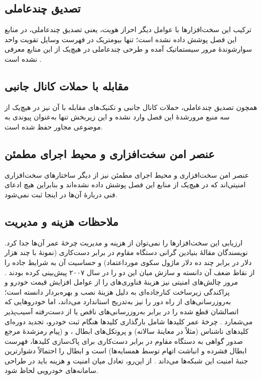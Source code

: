 \subsection{تصدیق چندعاملی}
ترکیب این سخت‌افزارها با عوامل دیگر احراز هویت، یعنی تصدیق چندعاملی، در منابع این فصل پوشش داده نشده است؛ تنها بیومتریک در فهرست وسایل تقویت واحد سوارشوندهٔ مرور سیستماتیک آمده و طرحی چندعاملی در هیچ‌یک از این منابع معرفی نشده است \cite{rahmawatiagustinaSystematicLiteratureReview2025}.

\subsection{مقابله با حملات کانال جانبی}
همچون تصدیق چندعاملی، حملات کانال جانبی و تکنیک‌های مقابله با آن نیز در هیچ‌یک از سه منبع مرورشدهٔ این فصل وارد نشده و این زیربخش تنها به‌عنوان پیوندی به موضوعی مجاور حفظ شده است.

\subsection{عنصر امن سخت‌افزاری و محیط اجرای مطمئن}
عنصر امن سخت‌افزاری و محیط اجرای مطمئن نیز از دیگر ساختارهای سخت‌افزاری امنیتی‌اند که در هیچ‌یک از منابع این فصل پوشش داده نشده‌اند و بنابراین هیچ ادعای فنی دربارهٔ آن‌ها در اینجا ثبت نمی‌شود.

\subsection{ملاحظات هزینه و مدیریت}
ارزیابی این سخت‌افزارها را نمی‌توان از هزینه و مدیریت چرخهٔ عمر آن‌ها جدا کرد. نویسندگان مقالهٔ بنیادین گرانی دستگاه مقاوم در برابر دست‌کاری (نمونهٔ  با چند هزار دلار در برابر چند ده دلار ماژول سکوی مورداعتماد) و حساسیت آن به شرایط جاده را از نقاط ضعف آن دانسته و سازش میان این دو را در سال ۲۰۰۷ پیش‌بینی کرده بودند \cite{SecuringVehicularAd}. مرور چالش‌های امنیتی نیز هزینهٔ فناوری‌های  را از عوامل افزایش قیمت خودرو و پراکندگی زیرساخت کنارجاده‌ای به دلیل هزینهٔ نصب و بهره‌بردار دانسته است؛ به‌روزرسانی‌های از راه دور را نیز به‌تدریج استاندارد می‌داند، اما خودروهایی که اتصالشان قطع شده را در برابر به‌روزرسانی‌های ناقص یا از دست‌رفته آسیب‌پذیر می‌شمارد \cite{farsimadanReviewSecurityChallenges2025}. چرخهٔ عمر کلیدها شامل بارگذاری کلیدها هنگام ثبت خودرو، تجدید دوره‌ای کلیدهای ناشناس (مثلاً در معاینهٔ سالانه) و پروتکل‌های ابطال ،  و  (پیام رمزشدهٔ مرجع صدور گواهی به دستگاه مقاوم در برابر دست‌کاری برای پاک‌سازی کلیدها، فهرست ابطال فشرده و انباشت اتهام توسط همسایه‌ها) است و ابطال را احتمالاً دشوارترین جنبهٔ امنیت این شبکه‌ها می‌داند \cite{SecuringVehicularAd}. از این‌رو، تعادل میان امنیت و هزینه باید در طراحی سامانه‌های خودرویی لحاظ شود.
